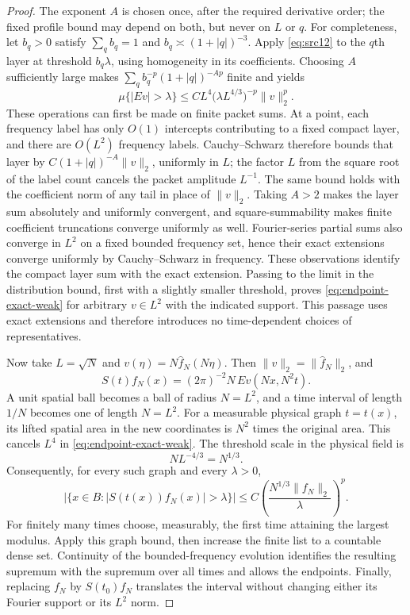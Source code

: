 \begin{proof}
The exponent $A$ is chosen once, after the required derivative order;
the fixed profile bound may depend on both, but never on $L$ or $q$.
For completeness, let $b_q>0$ satisfy $\sum_q b_q=1$ and
$b_q\asymp(1+|q|)^{-3}$.  Apply \eqref{eq:src12} to the $q$th layer at
threshold $b_q\lambda$, using homogeneity in its coefficients.  Choosing
$A$ sufficiently large makes
$\sum_q b_q^{-p}(1+|q|)^{-Ap}$ finite and yields
\begin{equation}
 \mu\{|Ev|>\lambda\}
 \le C L^4\bigl(\lambda L^{4/3}\bigr)^{-p}\|v\|_2^p.
 \label{eq:endpoint-exact-weak}
\end{equation}
These operations can first be made on finite packet sums.  At a point,
each frequency label has only $O(1)$ intercepts contributing to a fixed
compact layer, and there are $O(L^2)$ frequency labels.  Cauchy--Schwarz
therefore bounds that layer by $C(1+|q|)^{-A}\|v\|_2$, uniformly in $L$;
the factor $L$ from the square root of the label count cancels the
packet amplitude $L^{-1}$.  The same bound holds with the coefficient
norm of any tail in place of $\|v\|_2$.  Taking $A>2$ makes the layer sum
absolutely and uniformly convergent, and square-summability makes
finite coefficient truncations converge uniformly as well.
Fourier-series partial sums also converge in $L^2$ on a fixed bounded
frequency set, hence their exact extensions converge uniformly by
Cauchy--Schwarz in frequency.  These observations identify the compact
layer sum with the exact extension.  Passing to the limit in the distribution
bound, first with a slightly smaller threshold, proves
\eqref{eq:endpoint-exact-weak} for arbitrary $v\in L^2$ with the indicated
support.  This passage uses exact extensions and therefore introduces no
time-dependent choices of representatives.

Now take $L=\sqrt N$ and
$v(\eta)=N\widehat f_N(N\eta)$.  Then
$\|v\|_2=\|\widehat f_N\|_2$, and
\begin{equation}
 S(t)f_N(x)=(2\pi)^{-2}N\,Ev(Nx,N^2t).
 \label{eq:endpoint-frequency-scaling}
\end{equation}
A unit spatial ball becomes a ball of radius $N=L^2$, and a time interval
of length $1/N$ becomes one of length $N=L^2$.  For a measurable physical
graph $t=t(x)$, its lifted spatial area in the new coordinates is $N^2$
times the original area.  This cancels $L^4$ in
\eqref{eq:endpoint-exact-weak}.  The threshold scale in the physical
field is
\[
 N L^{-4/3}=N^{1/3}.
\]
Consequently, for every such graph and every $\lambda>0$,
\[
 \bigl|\{x\in B:|S(t(x))f_N(x)|>\lambda\}\bigr|
 \le C\left(\frac{N^{1/3}\|f_N\|_2}{\lambda}\right)^p.
\]
For finitely many times choose, measurably, the first time attaining the
largest modulus.  Apply this graph bound, then increase the finite list
to a countable dense set.  Continuity of the bounded-frequency evolution
identifies the resulting supremum with the supremum over all times and
allows the endpoints.  Finally, replacing $f_N$ by $S(t_0)f_N$ translates
the interval without changing either its Fourier support or its $L^2$
norm.
\end{proof}

